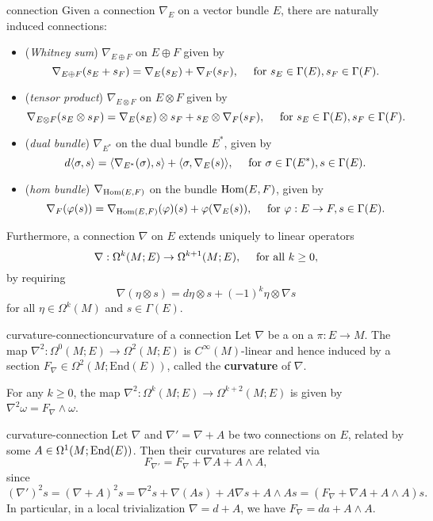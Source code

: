\begin{example}{connection}
    Given a connection $\nabla_E$ on a vector bundle $E$, there are naturally induced connections:
    \begin{itemize}
        \item (\textit{Whitney sum}) $\nabla_{E \oplus F}$ on $E \oplus F$ given by
        \[ \nabla_{E \oplus F}(s_E + s_F) = \nabla_E(s_E) + \nabla_F(s_F), \quad \textup{ for } s_E \in \Gamma(E), s_F \in \Gamma(F) . \]
        \item (\textit{tensor product}) $\nabla_{E \otimes F}$ on $E \otimes F$ given by
        \[ \nabla_{E \otimes F}(s_E \otimes s_F) = \nabla_E(s_E) \otimes s_F + s_E \otimes \nabla_F(s_F), \quad \textup{ for } s_E \in \Gamma(E), s_F \in \Gamma(F) . \]
        \item (\textit{dual bundle}) $\nabla_{E^*}$ on the dual bundle $E^*$, given by
        \[ d \langle \sigma, s \rangle = \langle \nabla_{E^*} (\sigma), s \rangle + \langle \sigma, \nabla_E(s) \rangle, \quad \textup{ for } \sigma \in \Gamma(E^*), s \in \Gamma(E) . \]
        \item (\textit{hom bundle}) $\nabla_{\text{Hom}(E, F)}$ on the bundle $\text{Hom}(E, F)$, given by
        \[ \nabla_F(\varphi(s)) = \nabla_{\text{Hom}(E, F)}(\varphi)(s) + \varphi(\nabla_E(s)), \quad \textup{ for } \varphi : E \to F, s \in \Gamma(E) . \]
    \end{itemize}
    Furthermore, a connection $\nabla$ on $E$ extends uniquely to linear operators
    \[ \nabla : \Omega^k(M; E) \to \Omega^{k + 1}(M; E), \quad \textup{ for all } k \ge 0,  \]
    by requiring
    \[ \nabla (\eta \otimes s) = d \eta \otimes s + (-1)^k \eta \otimes \nabla s \]
    for all $\eta \in \Omega^k(M)$ and $s \in \Gamma(E)$.
\end{example}

\begin{topic}{curvature-connection}{curvature of a connection}
    Let $\nabla$ be a  on a  $\pi : E \to M$. The map $\nabla^2 : \Omega^0(M; E) \to \Omega^2(M; E)$ is $C^\infty(M)$-linear and hence induced by a section $F_\nabla \in \Omega^2(M; \text{End}(E))$, called the \textbf{curvature} of $\nabla$.
    
    For any $k \ge 0$, the map $\nabla^2 : \Omega^k(M; E) \to \Omega^{k + 2}(M; E)$ is given by $\nabla^2 \omega = F_\nabla \wedge \omega$.
\end{topic}

\begin{example}{curvature-connection}
    Let $\nabla$ and $\nabla' = \nabla + A$ be two connections on $E$, related by some $A \in \Omega^1(M; \textup{End}(E))$. Then their curvatures are related via
    \[ F_{\nabla'} = F_\nabla + \nabla A + A \wedge A , \]
    since
    \[ (\nabla')^2 s = (\nabla + A)^2 s = \nabla^2 s + \nabla (As) + A \nabla s + A \wedge A s = (F_\nabla + \nabla A + A \wedge A) s . \]
    In particular, in a local trivialization $\nabla = d + A$, we have $F_\nabla = da + A \wedge A$.
\end{example}

